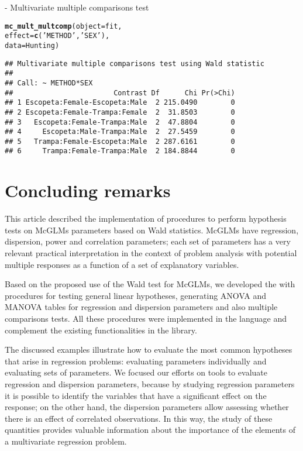 \documentclass[article]{jss}\usepackage[]{graphicx}\usepackage[]{xcolor}
\makeatletter
\newcommand{\hlstr}[1]{\textcolor[rgb]{0.192,0.494,0.8}{#1}}%
\newcommand{\hlstd}[1]{\textcolor[rgb]{0.345,0.345,0.345}{#1}}%
\newcommand{\hlkwc}[1]{\textcolor[rgb]{0.333,0.667,0.333}{#1}}%
\newcommand{\hlkwd}[1]{\textcolor[rgb]{0.737,0.353,0.396}{\textbf{#1}}}%
\newenvironment{kframe}{%
 \def\at@end@of@kframe{}%
 \ifinner\ifhmode%
  \def\at@end@of@kframe{\end{minipage}}%
  \begin{minipage}{\columnwidth}%
 \fi\fi%
 \def\FrameCommand##1{\hskip\@totalleftmargin \hskip-\fboxsep
 \colorbox{shadecolor}{##1}\hskip-\fboxsep
     \hskip-\linewidth \hskip-\@totalleftmargin \hskip\columnwidth}%
 \MakeFramed {\advance\hsize-\width
   \@totalleftmargin\z@ \linewidth\hsize
   \@setminipage}}%
 {\par\unskip\endMakeFramed%
 \at@end@of@kframe}
\newenvironment{knitrout}{}{} %
\makeatother
\begin{document}
 - Multivariate multiple comparisons test

\begin{knitrout}
\color{fgcolor}\begin{kframe}
\begin{alltt}
\hlkwd{mc_mult_multcomp}\hlstd{(}\hlkwc{object} \hlstd{= fit,}
                 \hlkwc{effect} \hlstd{=} \hlkwd{c}\hlstd{(}\hlstr{'METHOD'}\hlstd{,} \hlstr{'SEX'}\hlstd{),}
                 \hlkwc{data} \hlstd{= Hunting)}
\end{alltt}
\begin{verbatim}
## Multivariate multiple comparisons test using Wald statistic
## 
## Call: ~ METHOD*SEX
##                        Contrast Df      Chi Pr(>Chi)
## 1 Escopeta:Female-Escopeta:Male  2 215.0490        0
## 2 Escopeta:Female-Trampa:Female  2  31.8503        0
## 3   Escopeta:Female-Trampa:Male  2  47.8804        0
## 4     Escopeta:Male-Trampa:Male  2  27.5459        0
## 5   Trampa:Female-Escopeta:Male  2 287.6161        0
## 6     Trampa:Female-Trampa:Male  2 184.8844        0
\end{verbatim}
\end{kframe}
\end{knitrout}


\section{Concluding remarks}\label{sec:conclusao}

This article described the  implementation of procedures to perform hypothesis tests on McGLMs parameters based on Wald statistics. McGLMs have regression, dispersion, power and correlation parameters; each set of parameters has a very relevant practical interpretation in the context of problem analysis with potential multiple responses as a function of a set of explanatory variables.

Based on the proposed use of the Wald test for McGLMs, we developed the  with procedures for testing general linear hypotheses, generating ANOVA and MANOVA tables for regression and dispersion parameters and also multiple comparisons tests. All these procedures were implemented in the  language and complement the existing functionalities in the  library.

The discussed examples illustrate how to evaluate the most common hypotheses that arise in regression problems: evaluating parameters individually and evaluating sets of parameters. We focused our efforts on tools to evaluate regression and dispersion parameters, because by studying regression parameters it is possible to identify the variables that have a significant effect on the response; on the other hand, the dispersion parameters allow assessing whether there is an effect of correlated observations. In this way, the study of these quantities provides valuable information about the importance of the elements of a multivariate regression problem.
\end{document}
